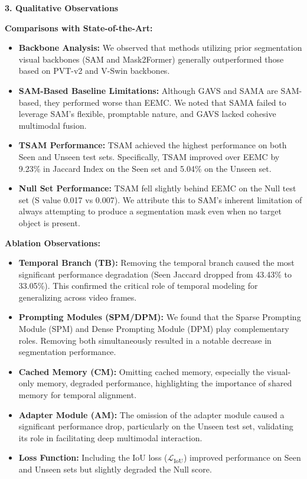 \vspace{1em}
\noindent\textbf{3. Qualitative Observations}

\vspace{0.5em}
\noindent\textbf{Comparisons with State-of-the-Art:}
\begin{itemize}
    \item \textbf{Backbone Analysis:} We observed that methods utilizing prior segmentation visual backbones (SAM and Mask2Former) generally outperformed those based on PVT-v2 and V-Swin backbones.
    \item \textbf{SAM-Based Baseline Limitations:} Although GAVS and SAMA are SAM-based, they performed worse than EEMC. We noted that SAMA failed to leverage SAM's flexible, promptable nature, and GAVS lacked cohesive multimodal fusion.
    \item \textbf{TSAM Performance:} TSAM achieved the highest performance on both Seen and Unseen test sets. Specifically, TSAM improved over EEMC by 9.23\% in Jaccard Index on the Seen set and 5.04\% on the Unseen set.
    \item \textbf{Null Set Performance:} TSAM fell slightly behind EEMC on the Null test set (S value 0.017 vs 0.007). We attribute this to SAM's inherent limitation of always attempting to produce a segmentation mask even when no target object is present.
\end{itemize}

\vspace{0.5em}
\noindent\textbf{Ablation Observations:}
\begin{itemize}
    \item \textbf{Temporal Branch (TB):} Removing the temporal branch caused the most significant performance degradation (Seen Jaccard dropped from 43.43\% to 33.05\%). This confirmed the critical role of temporal modeling for generalizing across video frames.
    \item \textbf{Prompting Modules (SPM/DPM):} We found that the Sparse Prompting Module (SPM) and Dense Prompting Module (DPM) play complementary roles. Removing both simultaneously resulted in a notable decrease in segmentation performance.
    \item \textbf{Cached Memory (CM):} Omitting cached memory, especially the visual-only memory, degraded performance, highlighting the importance of shared memory for temporal alignment.
    \item \textbf{Adapter Module (AM):} The omission of the adapter module caused a significant performance drop, particularly on the Unseen test set, validating its role in facilitating deep multimodal interaction.
    \item \textbf{Loss Function:} Including the IoU loss ($\mathcal{L}_{\mathrm{IoU}}$) improved performance on Seen and Unseen sets but slightly degraded the Null score.
\end{itemize}

